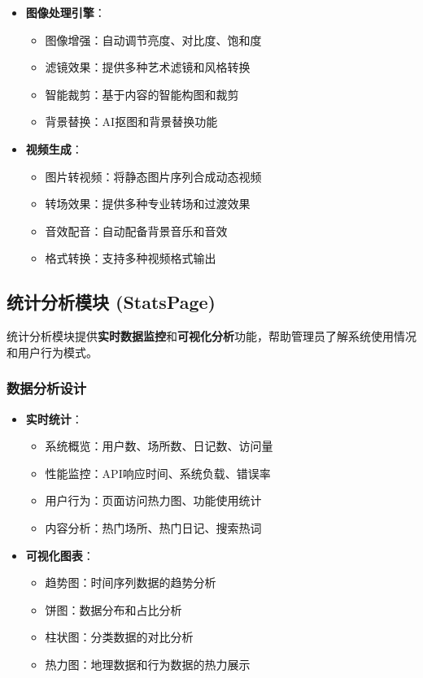 \documentclass[12pt,a4paper]{article}
\begin{document}
\begin{itemize}
    \item \textbf{图像处理引擎}：
    \begin{itemize}
        \item 图像增强：自动调节亮度、对比度、饱和度
        \item 滤镜效果：提供多种艺术滤镜和风格转换
        \item 智能裁剪：基于内容的智能构图和裁剪
        \item 背景替换：AI抠图和背景替换功能
    \end{itemize}
    
    \item \textbf{视频生成}：
    \begin{itemize}
        \item 图片转视频：将静态图片序列合成动态视频
        \item 转场效果：提供多种专业转场和过渡效果
        \item 音效配音：自动配备背景音乐和音效
        \item 格式转换：支持多种视频格式输出
    \end{itemize}
\end{itemize}

\subsection{统计分析模块 (StatsPage)}

\begin{designbox}[title={数据可视化分析}]
统计分析模块提供\textbf{实时数据监控}和\textbf{可视化分析}功能，帮助管理员了解系统使用情况和用户行为模式。
\end{designbox}

\subsubsection{数据分析设计}

\begin{itemize}
    \item \textbf{实时统计}：
    \begin{itemize}
        \item 系统概览：用户数、场所数、日记数、访问量
        \item 性能监控：API响应时间、系统负载、错误率
        \item 用户行为：页面访问热力图、功能使用统计
        \item 内容分析：热门场所、热门日记、搜索热词
    \end{itemize}
    
    \item \textbf{可视化图表}：
    \begin{itemize}
        \item 趋势图：时间序列数据的趋势分析
        \item 饼图：数据分布和占比分析
        \item 柱状图：分类数据的对比分析
        \item 热力图：地理数据和行为数据的热力展示
    \end{itemize}
\end{itemize}
\end{document}
